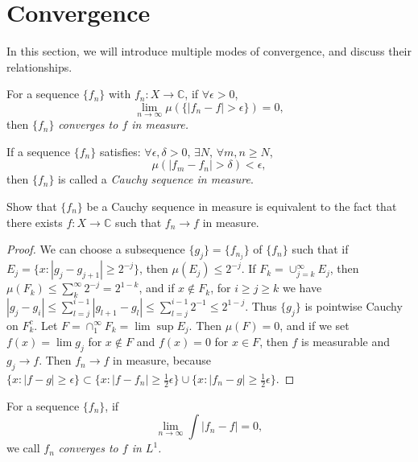 \section{Convergence}
\begin{rem}
    In this section, we will introduce multiple modes of convergence, 
    and discuss their relationships.
\end{rem}
\begin{defn}
    \label{Defn:ConvergeInMeasure}
    For a sequence $\{f_{n}\}$ with $f_{n}:X\rightarrow\mathbb{C}$, 
    if $\forall\epsilon>0$, 
    \begin{displaymath}
        \lim_{n\rightarrow\infty}\mu(\{|f_n-f|>\epsilon\})=0,
    \end{displaymath}
    then $\{f_n\}$ \textit{converges to $f$ in measure.}
\end{defn}
\begin{defn}
    \label{Defn:CauchyInMeasure}
    If a sequence $\{f_{n}\}$ satisfies: $\forall\epsilon,\delta>0$, 
    $\exists N$, $\forall m,n\ge N$, 
    \begin{displaymath}
        \mu(|f_{m}-f_{n}|>\delta)<\epsilon,
    \end{displaymath}
    then $\{f_{n}\}$ is called a \textit{Cauchy sequence in measure}.
\end{defn}
\begin{exc}
    Show that $\{f_{n}\}$ be a Cauchy sequence in measure 
    is equivalent to the fact that 
    there exists $f:X\rightarrow\mathbb{C}$ such that 
    $f_{n}\rightarrow f$ in measure.
\end{exc}
\begin{proof}
    We can choose a subsequence $\{g_j\}=\{f_{n_j}\}$ of $\{f_n\}$
    such that if $E_j=\{x:|g_j-g_{j+1}|\geq2^{-j}\}$, then $\mu(E_j)
    \leq2^{-j}$. If $F_k=\cup_{j=k}^{\infty}E_j$, then $\mu(F_k)
    \leq\sum_{k}^{\infty}2^{-j}=2^{1-k}$, and if $x\notin F_k$, for
    $i\geq j\geq k$ we have $|g_j-g_i|\leq\sum_{l=j}^{i-1}|g_{l+1}-g_l|
    \leq\sum_{l=j}^{i-1}2^{-1}\leq2^{1-j}$. Thus $\{g_j\}$ is pointwise
    Cauchy on $F_k^c$. Let $F=\cap_{1}^{\infty}F_k=\lim\sup E_j$.
    Then $\mu(F)=0$, and if we set $f(x)=\lim g_j$ for $x\notin F$ 
    and $f(x)=0$ for $x\in F$, then $f$ is measurable and $g_j\rightarrow f$.
    Then $f_n\rightarrow f$ in measure, because $\{x:|f-g|\geq\epsilon\}
    \subset\{x:|f-f_n|\geq\frac{1}{2}\epsilon\}\cup
    \{x:|f_n-g|\geq\frac{1}{2}\epsilon\}$.
\end{proof}
\begin{defn}
    \label{Defn:ConvergenceInL1}
    For a sequence $\{f_n\}$, if 
    \begin{displaymath}
        \lim_{n\rightarrow\infty}\int|f_n-f|=0,
    \end{displaymath}
    we call $f_{n}$ \textit{converges to $f$ in $L^{1}$.}
\end{defn}

